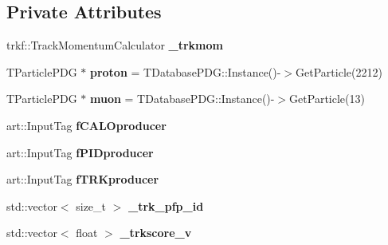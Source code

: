 \subsection*{Private Attributes}
\begin{DoxyCompactItemize}
\item 
\hypertarget{classanalysis_1_1TrackAnalysis_aa69136b70c77e0f034fe009b86ba591b}{trkf\-::\-Track\-Momentum\-Calculator {\bfseries \-\_\-trkmom}}\label{classanalysis_1_1TrackAnalysis_aa69136b70c77e0f034fe009b86ba591b}

\item 
\hypertarget{classanalysis_1_1TrackAnalysis_a4adc7f89c334ab93747a8d4c4abbcc6d}{T\-Particle\-P\-D\-G $\ast$ {\bfseries proton} = T\-Database\-P\-D\-G\-::\-Instance()-\/$>$Get\-Particle(2212)}\label{classanalysis_1_1TrackAnalysis_a4adc7f89c334ab93747a8d4c4abbcc6d}

\item 
\hypertarget{classanalysis_1_1TrackAnalysis_a0fe3b9e7864aaaa36b5f52826b4e3eb9}{T\-Particle\-P\-D\-G $\ast$ {\bfseries muon} = T\-Database\-P\-D\-G\-::\-Instance()-\/$>$Get\-Particle(13)}\label{classanalysis_1_1TrackAnalysis_a0fe3b9e7864aaaa36b5f52826b4e3eb9}

\item 
\hypertarget{classanalysis_1_1TrackAnalysis_a0ceaf940b041eda0237cc73cd330d18d}{art\-::\-Input\-Tag {\bfseries f\-C\-A\-L\-Oproducer}}\label{classanalysis_1_1TrackAnalysis_a0ceaf940b041eda0237cc73cd330d18d}

\item 
\hypertarget{classanalysis_1_1TrackAnalysis_a349dc117e508190c619cd9f47ea7647e}{art\-::\-Input\-Tag {\bfseries f\-P\-I\-Dproducer}}\label{classanalysis_1_1TrackAnalysis_a349dc117e508190c619cd9f47ea7647e}

\item 
\hypertarget{classanalysis_1_1TrackAnalysis_a45abdcf3140e68a2ce90501e33a00eb3}{art\-::\-Input\-Tag {\bfseries f\-T\-R\-Kproducer}}\label{classanalysis_1_1TrackAnalysis_a45abdcf3140e68a2ce90501e33a00eb3}

\item 
\hypertarget{classanalysis_1_1TrackAnalysis_a6ff6b242cbf5345bc77a2a574218ccd9}{std\-::vector$<$ size\-\_\-t $>$ {\bfseries \-\_\-trk\-\_\-pfp\-\_\-id}}\label{classanalysis_1_1TrackAnalysis_a6ff6b242cbf5345bc77a2a574218ccd9}

\item 
\hypertarget{classanalysis_1_1TrackAnalysis_a048c5266c939a318c717a8002f7ea1da}{std\-::vector$<$ float $>$ {\bfseries \-\_\-trkscore\-\_\-v}}\label{classanalysis_1_1TrackAnalysis_a048c5266c939a318c717a8002f7ea1da}


\end{DoxyCompactItemize}
